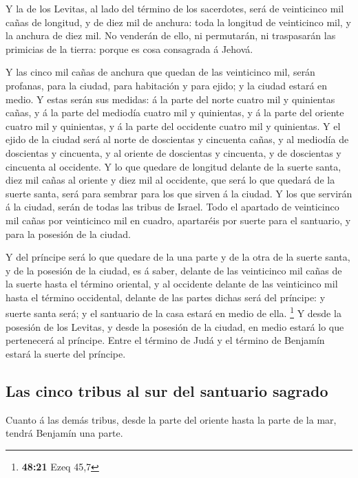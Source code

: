  Y la de los Levitas, al lado del término de los
sacerdotes, será de veinticinco mil cañas de longitud, y de diez mil de
anchura: toda la longitud de veinticinco mil, y la anchura de diez mil.
 No venderán de ello, ni permutarán, ni traspasarán las
primicias de la tierra: porque es cosa consagrada á Jehová.

 Y las cinco mil cañas de anchura que quedan de las
veinticinco mil, serán profanas, para la ciudad, para habitación y para
ejido; y la ciudad estará en medio.  Y estas serán sus
medidas: á la parte del norte cuatro mil y quinientas cañas, y á la
parte del mediodía cuatro mil y quinientas, y á la parte del oriente
cuatro mil y quinientas, y á la parte del occidente cuatro mil y
quinientas.  Y el ejido de la ciudad será al norte de
doscientas y cincuenta cañas, y al mediodía de doscientas y cincuenta, y
al oriente de doscientas y cincuenta, y de doscientas y cincuenta al
occidente.  Y lo que quedare de longitud delante de la
suerte santa, diez mil cañas al oriente y diez mil al occidente, que
será lo que quedará de la suerte santa, será para sembrar para los que
sirven á la ciudad.  Y los que servirán á la ciudad, serán
de todas las tribus de Israel.  Todo el apartado de
veinticinco mil cañas por veinticinco mil en cuadro, apartaréis por
suerte para el santuario, y para la posesión de la ciudad.

 Y del príncipe será lo que quedare de la una parte y de la
otra de la suerte santa, y de la posesión de la ciudad, es á saber,
delante de las veinticinco mil cañas de la suerte hasta el término
oriental, y al occidente delante de las veinticinco mil hasta el término
occidental, delante de las partes dichas será del príncipe: y suerte
santa será; y el santuario de la casa estará en medio de ella.
\footnote{\textbf{48:21} Ezeq 45,7}  Y desde la posesión de
los Levitas, y desde la posesión de la ciudad, en medio estará lo que
pertenecerá al príncipe. Entre el término de Judá y el término de
Benjamín estará la suerte del príncipe.

\hypertarget{las-cinco-tribus-al-sur-del-santuario-sagrado}{%
\subsection{Las cinco tribus al sur del santuario
sagrado}\label{las-cinco-tribus-al-sur-del-santuario-sagrado}}

 Cuanto á las demás tribus, desde la parte del oriente
hasta la parte de la mar, tendrá Benjamín una parte.

